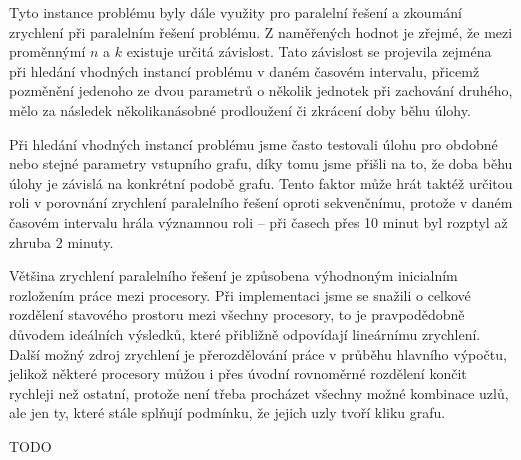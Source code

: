 \documentclass[12pt]{article}
\begin{document}
Tyto instance problému byly dále využity pro paralelní řešení a zkoumání zrychlení při paralelním řešení problému.
Z naměřených hodnot je zřejmé, že mezi proměnnýmí $n$ a $k$ existuje určitá závislost. 
Tato závislost se projevila zejména při hledání vhodných instancí problému v daném časovém intervalu, 
přicemž pozměnění jedenoho ze dvou parametrů o několik jednotek při zachování druhého, mělo za následek
několikanásobné prodloužení či zkrácení doby běhu úlohy.

Při hledání vhodných instancí problému jsme často testovali úlohu pro obdobné nebo stejné parametry vstupního grafu,
díky tomu jsme přišli na to, že doba běhu úlohy je závislá na konkrétní podobě grafu.
Tento faktor může hrát taktéž určitou roli v porovnání zrychlení paralelního řešení oproti sekvenčnímu, 
protože v daném časovém intervalu hrála významnou roli -- při časech přes 10 minut byl rozptyl až zhruba 2 minuty.

Většina zrychlení paralelního řešení je způsobena výhodnoným inicialním rozložením práce mezi procesory.
Při implementaci jsme se snažili o celkové rozdělení stavového prostoru mezi všechny procesory, to je pravpodědobně důvodem ideálních výsledků, které přibližně odpovídají lineárnímu zrychlení.
Další možný zdroj zrychlení je přerozdělování práce v průběhu hlavního výpočtu, jelikož některé procesory můžou i přes 
úvodní rovnoměrné rozdělení končit rychleji než ostatní, protože není třeba procházet všechny možné kombinace uzlů,
ale jen ty, které stále splňují podmínku, že jejich uzly tvoří kliku grafu.

TODO
\end{document}
